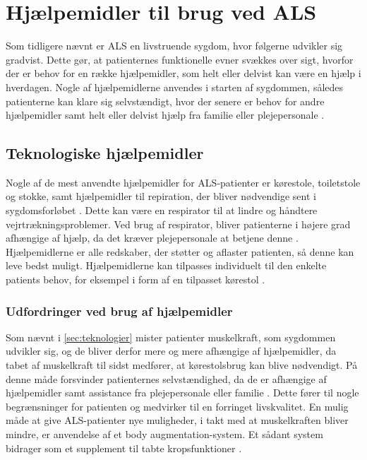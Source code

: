 \section{Hjælpemidler til brug ved ALS} \label{sec:teknologier}
Som tidligere nævnt er ALS en livstruende sygdom, hvor følgerne udvikler sig gradvist. Dette gør, at patienternes funktionelle evner svækkes over sigt, hvorfor der er behov for en række hjælpemidler, som helt eller delvist kan være en hjælp i hverdagen. Nogle af hjælpemidlerne anvendes i starten af sygdommen, således patienterne kan klare sig selvstændigt, hvor der senere er behov for andre hjælpemidler samt helt eller delvist hjælp fra familie eller plejepersonale \citep{brandt2010}.

\subsection{Teknologiske hjælpemidler}
Nogle af de mest anvendte hjælpemidler for ALS-patienter er kørestole, toiletstole og stokke, \citep{brandt2010} samt hjælpemidler til repiration, der bliver nødvendige sent i sygdomsforløbet \citep{hefferman2006}. Dette kan være en respirator til at lindre og håndtere vejrtrækningsproblemer. Ved brug af respirator, bliver patienterne i højere grad afhængige af hjælp, da det kræver plejepersonale at betjene denne  \citep{rcfm2001}.  Hjælpemidlerne er alle redskaber, der støtter og aflaster patienten, så denne kan leve bedst muligt. Hjælpemidlerne kan tilpasses individuelt til den enkelte patients behov, for eksempel i form af en tilpasset kørestol \citep{brandt2010}.

\subsubsection{Udfordringer ved brug af hjælpemidler}
Som nævnt i \autoref{sec:teknologier} mister patienter muskelkraft, som sygdommen udvikler sig, og de bliver derfor mere og mere afhængige af hjælpemidler, da tabet af muskelkraft til sidst medfører, at kørestolsbrug kan blive nødvendigt. På denne måde forsvinder patienternes selvstændighed, da de er afhængige af hjælpemidler samt assistance fra plejepersonale eller familie \citep{brandt2010}. Dette fører til nogle begrænsninger for patienten og medvirker til en forringet livskvalitet. En mulig måde at give ALS-patienter nye muligheder, i takt med at muskelkraften bliver mindre, er anvendelse af et body augmentation-system. Et sådant system bidrager som et supplement til tabte kropsfunktioner \citep{erlen2003}.

